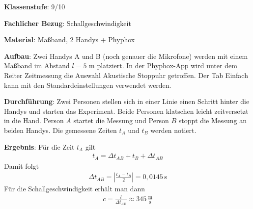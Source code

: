 \documentclass[../main.tex]{subfiles}
\begin{document}
\begin{tcolorbox}[
    width=\textwidth,
    height=\textheight,
    title=Phyphox: Schallgeschwindigkeit,
    fonttitle=\Large,
    before title=\vspace{0.2cm}, after title=\vspace{0.2cm},
    colback=white,
    title filled=true, 
    colbacktitle=myorange,
    colframe=black,
    coltitle=black,
    ]

    \vspace{0.2cm}

    \textbf{Klassenstufe}: 9/10

    \vspace{0.4cm}

    \textbf{Fachlicher Bezug}: Schallgeschwindigkeit

    \vspace{0.4cm}
    \textbf{Material}: Maßband, 2 Handys + Phyphox 

    \vspace{0.4cm}
    \begin{center}
        \def\svgwidth{400pt}
        
    \end{center}

    \vspace{0.5cm}
        \textbf{Aufbau}: Zwei Handys A und B (noch genauer die Mikrofone) werden mit einem Maßband im Abstand $l=5$ m platziert. In der Phyphox-App wird unter dem Reiter \glqq Zeitmessung\grqq{} die Auswahl \glqq Akustische Stoppuhr\grqq{} getroffen. Der Tab \glqq Einfach\grqq{} kann mit den Standard\-einstellungen verwendet werden.

    \vspace{0.5cm}
    \textbf{Durchführung}: Zwei Personen stellen sich in einer Linie einen Schritt hinter die Handys und starten das Experiment. Beide Personen klatschen leicht zeitversetzt in die Hand. Person $A$ startet die Messung und Person $B$ stoppt die Messung an beiden Handys. Die gemessene Zeiten $t_A$ und $t_B$ werden notiert.

    \vspace{0.5cm}
    \begin{minipage}[c]{0.62\textwidth}
\textbf{Ergebnis}: Für die Zeit $t_A$ gilt
    \begin{align*}
        t_A = \Delta t_{AB} + t_B + \Delta t_{AB}
    \end{align*}
    Damit folgt
    \begin{align*}
        \Delta t_{AB} = \left | \frac{t_A-t_B}{2} \right | = 0,0145 \, \text{s} 
    \end{align*}
    Für die Schallgeschwindigkeit erhält man dann
    \begin{align*}
        c = \frac{l}{\Delta t_{AB}} \approx 345 \, \frac{\text{m}}{\text{s}}
    \end{align*}


\end{minipage}
\end{tcolorbox}
\end{document}
